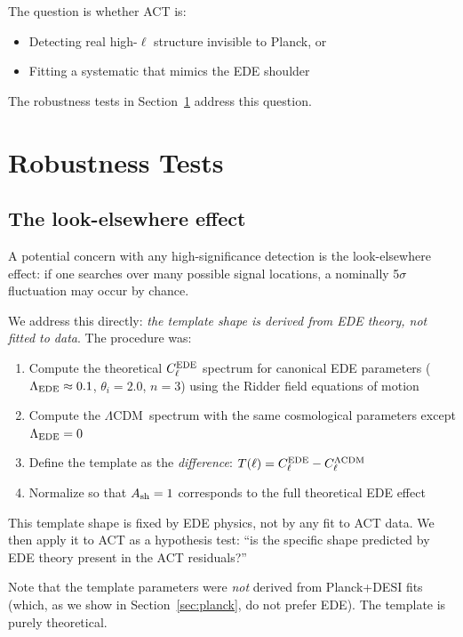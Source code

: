 \documentclass[twocolumn,showpacs,preprintnumbers,amsmath,amssymb,prd]{revtex4-2}
\newcommand{\lcdm}{$\Lambda$CDM}
\begin{document}
The question is whether ACT is:
\begin{itemize}
\item Detecting real high-$\ell$ structure invisible to Planck, or
\item Fitting a systematic that mimics the EDE shoulder
\end{itemize}

The robustness tests in Section~\ref{sec:robust} address this question.

\section{Robustness Tests}
\label{sec:robust}

\subsection{The look-elsewhere effect}

A potential concern with any high-significance detection is the 
look-elsewhere effect: if one searches over many possible signal 
locations, a nominally 5$\sigma$ fluctuation may occur by chance.

We address this directly: \emph{the template shape is derived from EDE 
theory, not fitted to data}. The procedure was:
\begin{enumerate}
\item Compute the theoretical $C_\ell^{\rm EDE}$ spectrum for canonical 
EDE parameters ($\Lambda_{\rm EDE} \approx 0.1$, $\theta_i = 2.0$, $n = 3$) 
using the Ridder field equations of motion
\item Compute the \lcdm\ spectrum with the same cosmological parameters 
except $\Lambda_{\rm EDE} = 0$
\item Define the template as the \emph{difference}: 
$T(\ell) = C_\ell^{\rm EDE} - C_\ell^{\Lambda\rm CDM}$
\item Normalize so that $A_{\rm sh} = 1$ corresponds to the full 
theoretical EDE effect
\end{enumerate}
This template shape is fixed by EDE physics, not by any fit to ACT data. 
We then apply it to ACT as a hypothesis test: ``is the specific shape 
predicted by EDE theory present in the ACT residuals?''

Note that the template parameters were \emph{not} derived from 
Planck+DESI fits (which, as we show in Section~\ref{sec:planck}, do not 
prefer EDE). The template is purely theoretical.
\end{document}
